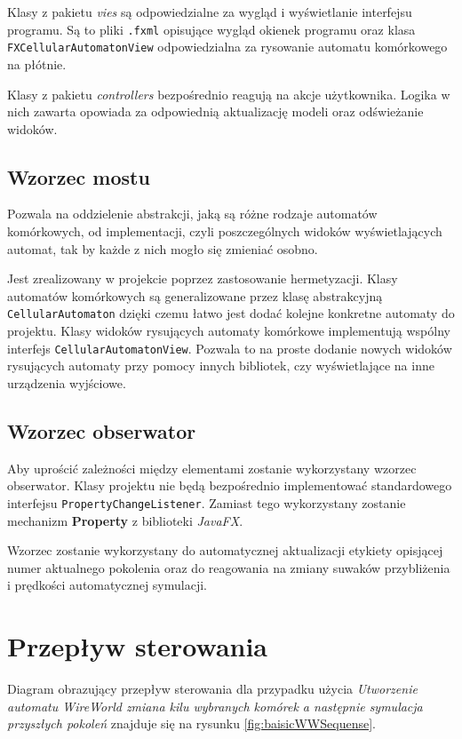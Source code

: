 \documentclass{report}
\begin{document}
Klasy z pakietu \textit{vies} są odpowiedzialne za wygląd i wyświetlanie interfejsu programu. Są to pliki \texttt{.fxml} opisujące wygląd okienek programu oraz klasa \texttt{FXCellularAutomatonView} odpowiedzialna za rysowanie automatu komórkowego na płótnie.

Klasy z pakietu \textit{controllers} bezpośrednio reagują na akcje użytkownika. Logika w nich zawarta opowiada za odpowiednią aktualizację modeli oraz odświeżanie widoków.

\subsection{Wzorzec mostu}
Pozwala na oddzielenie abstrakcji, jaką są różne rodzaje automatów komórkowych, od implementacji, czyli poszczególnych widoków wyświetlających automat, tak by każde z nich mogło się zmieniać osobno.

Jest zrealizowany w projekcie poprzez zastosowanie hermetyzacji.
Klasy automatów komórkowych są generalizowane przez klasę abstrakcyjną \texttt{CellularAutomaton} dzięki czemu łatwo jest dodać kolejne konkretne automaty do projektu.
Klasy widoków rysujących automaty komórkowe implementują wspólny interfejs \texttt{CellularAutomatonView}. Pozwala to na proste dodanie nowych widoków rysujących automaty przy pomocy innych bibliotek, czy wyświetlające na inne urządzenia wyjściowe.

\subsection{Wzorzec obserwator}
Aby uprościć zależności między elementami zostanie wykorzystany wzorzec obserwator.
Klasy projektu nie będą bezpośrednio implementować standardowego interfejsu \texttt{PropertyChangeListener}.
Zamiast tego wykorzystany zostanie mechanizm \textbf{Property} z biblioteki \textit{JavaFX}.

Wzorzec zostanie wykorzystany do automatycznej aktualizacji etykiety opisjącej numer aktualnego pokolenia oraz do reagowania na zmiany suwaków przybliżenia i prędkości automatycznej symulacji.

\section{Przepływ sterowania}
Diagram obrazujący przepływ sterowania dla przypadku użycia \textit{Utworzenie automatu WireWorld zmiana kilu wybranych komórek a następnie symulacja przyszłych pokoleń} znajduje się na rysunku \ref{fig:baisicWWSequense}.
\end{document}
